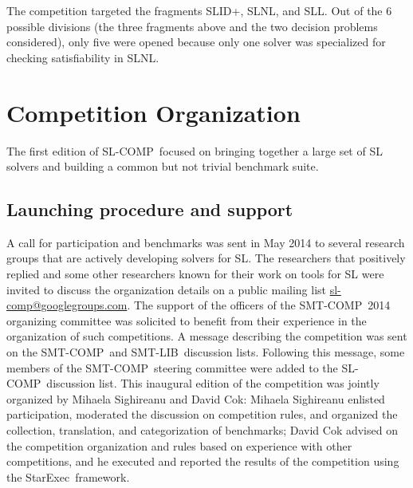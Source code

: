\documentclass[twoside,11pt]{article}
\newcommand{\SLRD}{\textsc{SLID}}
\newcommand{\SLNL}{\textsc{SLNL}}
\newcommand{\SLL}{\textsc{SLL}}
\newcommand{\smtlib}{\textsf{SMT-LIB}}
\newcommand{\smtcomp}{\textsf{SMT-COMP}}
\newcommand{\slcomp}{\textsf{SL-COMP}}
\newcommand{\starexec}{\textsf{StarExec}}
\begin{document}
\noindent
The competition targeted the fragments \SLRD+, \SLNL, and \SLL. 
Out of the 6 possible divisions (the three fragments above and the two decision problems considered), only five were opened because only one solver was specialized for checking satisfiability in \SLNL.


\section{Competition Organization}

The first edition of \slcomp\ focused on %
bringing together a large set of SL solvers and
building a common but not trivial benchmark suite. 

\subsection{Launching procedure and support}
A call for participation and benchmarks was sent
in May 2014 %
to several research groups 
that are actively developing solvers for SL.
The researchers that positively replied and some other researchers known for their work on tools for SL were invited to discuss the organization details on a public mailing list \url{sl-comp@googlegroups.com}.
The support of the officers of the \smtcomp\ 2014 organizing committee was solicited to benefit from their experience in the organization of such competitions.
%
A message describing the competition was sent on the \smtcomp\ and \smtlib\ discussion lists. Following this message, some members of the \smtcomp\ steering committee were added to the \slcomp\ discussion list. 
This inaugural edition of the competition was jointly organized by Mihaela Sighireanu and David Cok:
Mihaela Sighireanu enlisted participation, moderated the discussion on competition rules, and organized the 
collection, translation, and categorization of benchmarks; 
David Cok advised on the competition organization and rules based on experience with other competitions, and he executed and reported the results of the competition using the \starexec\ framework.
\end{document}
